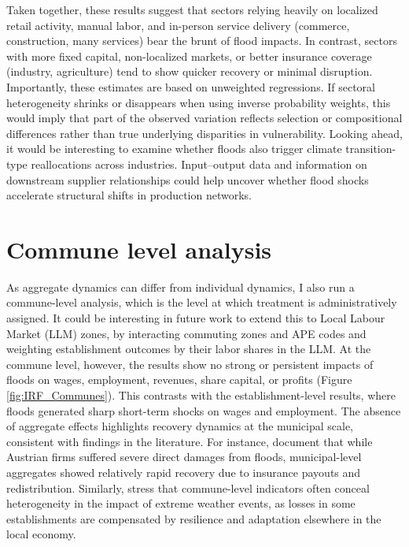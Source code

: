 Taken together, these results suggest that sectors relying heavily on localized retail activity, manual labor, and in-person service delivery (commerce, construction, many services) bear the brunt of flood impacts. In contrast, sectors with more fixed capital, non-localized markets, or better insurance coverage (industry, agriculture) tend to show quicker recovery or minimal disruption. Importantly, these estimates are based on unweighted regressions. If sectoral heterogeneity shrinks or disappears when using inverse probability weights, this would imply that part of the observed variation reflects selection or compositional differences rather than true underlying disparities in vulnerability. Looking ahead, it would be interesting to examine whether floods also trigger climate transition-type reallocations across industries. Input–output data and information on downstream supplier relationships could help uncover whether flood shocks accelerate structural shifts in production networks.

\section{Commune level analysis}
As aggregate dynamics can differ from individual dynamics, I also run a commune-level analysis, which is the level at which treatment is administratively assigned. It could be interesting in future work to extend this to Local Labour Market (LLM) zones, by interacting commuting zones and APE codes and weighting establishment outcomes by their labor shares in the LLM.
At the commune level, however, the results show no strong or persistent impacts of floods on wages, employment, revenues, share capital, or profits (Figure \ref{fig:IRF_Communes}). This contrasts with the establishment-level results, where floods generated sharp short-term shocks on wages and employment. The absence of aggregate effects highlights recovery dynamics at the municipal scale, consistent with findings in the literature. For instance, \cite{leiter2009creative} document that while Austrian firms suffered severe direct damages from floods, municipal-level aggregates showed relatively rapid recovery due to insurance payouts and redistribution. Similarly, \cite{usman2024going} stress that commune-level indicators often conceal heterogeneity in the impact of extreme weather events, as losses in some establishments are compensated by resilience and adaptation elsewhere in the local economy.

